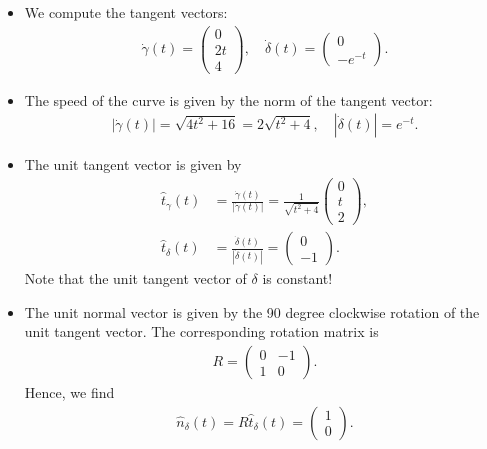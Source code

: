 \documentclass[11pt]{article}
\begin{document}
\begin{solution}
    \begin{itemize}
        \item We compute the tangent vectors:
        \begin{align}
            \dot \gamma(t) = \begin{pmatrix} 0 \\ 2t \\ 4 \end{pmatrix}, \quad \dot \delta(t) = \begin{pmatrix} 0 \\ -e^{-t} \end{pmatrix}.
        \end{align}
        \item The speed of the curve is given by the norm of the tangent vector:
        \begin{align}
            |\dot \gamma(t)| = \sqrt{4t^2 + 16} = 2 \sqrt{t^2 + 4}, \quad |\dot \delta(t)| = e^{-t}.
        \end{align}
        \item The unit tangent vector is given by
        \begin{align}
            \hat t_\gamma(t) &= \frac{\dot \gamma(t)}{|\dot \gamma(t)|}  = \frac{1}{\sqrt{t^2 + 4}} \begin{pmatrix} 0 \\ t \\ 2 \end{pmatrix},\\
            \hat t_\delta(t) &= \frac{\dot \delta(t)}{|\dot \delta(t)|} = \begin{pmatrix} 0 \\ -1 \end{pmatrix}.
        \end{align}
        Note that the unit tangent vector of $\delta$ is constant!
        \item The unit normal vector is given by the 90 degree clockwise rotation of the unit tangent vector. The corresponding rotation matrix is
        \begin{align}
            R = \begin{pmatrix} 0 & -1 \\ 1 & 0 \end{pmatrix}.
        \end{align}
        Hence, we find
        \begin{align}
            \hat n_\delta(t) = R \hat t_\delta(t) = \begin{pmatrix} 1 \\ 0 \end{pmatrix}.

\end{align}
\end{itemize}
\end{solution}
\end{document}
